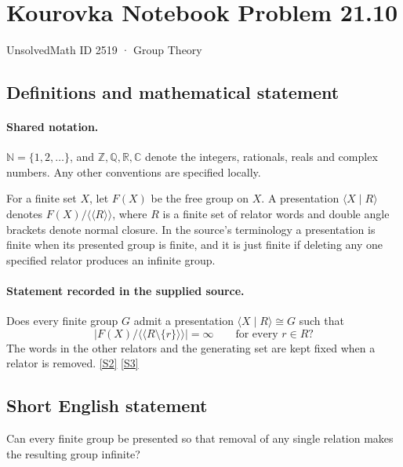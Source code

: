 \documentclass[11pt]{article}
\newcommand{\sref}[2]{\hyperlink{source:#1:#2}{[S#2]}}
\begin{document}
\setcounter{section}{2518}
\section{Kourovka Notebook Problem 21.10}\label{2519}
{\small\sffamily UnsolvedMath ID 2519 · Group Theory}
\subsection{Definitions and mathematical statement}

\paragraph{Shared notation.}$\mathbb N=\{1,2,\ldots\}$, and $\mathbb Z,\mathbb Q,\mathbb R,\mathbb C$ denote the integers, rationals, reals and complex numbers. Any other conventions are specified locally.


For a finite set $X$, let $F(X)$ be the free group on $X$. A presentation $\langle X\mid R\rangle$ denotes $F(X)/\langle\!\langle R\rangle\!\rangle$, where $R$ is a finite set of relator words and double angle brackets denote normal closure. In the source's terminology a presentation is finite when its presented group is finite, and it is just finite if deleting any one specified relator produces an infinite group.
\paragraph{Statement recorded in the supplied source.}
Does every finite group $G$ admit a presentation $\langle X\mid R\rangle\cong G$ such that
\[
 \bigl|F(X)/\langle\!\langle R\setminus\{r\}\rangle\!\rangle\bigr|=\infty
 \qquad\text{for every }r\in R?
\]
The words in the other relators and the generating set are kept fixed when a relator is removed. \sref{2519}{2} \sref{2519}{3}
\subsection{Short English statement}
Can every finite group be presented so that removal of any single relation makes the resulting group infinite?
\end{document}
